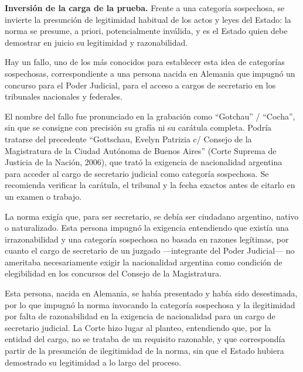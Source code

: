 \documentclass[12pt,oneside]{book}
\begin{document}
\begin{important}
\textbf{Inversión de la carga de la prueba.} Frente a una categoría sospechosa, se invierte la presunción de legitimidad habitual de los actos y leyes del Estado: la norma se presume, a priori, potencialmente inválida, y es el Estado quien debe demostrar en juicio su legitimidad y razonabilidad.
\end{important}

Hay un fallo, uno de los más conocidos para establecer esta idea de categorías sospechosas, correspondiente a una persona nacida en Alemania que impugnó un concurso para el Poder Judicial, para el acceso a cargos de secretario en los tribunales nacionales y federales.

\begin{important}
El nombre del fallo fue pronunciado en la grabación como ``Gotchau'' / ``Cocha'', sin que se consigne con precisión su grafía ni su carátula completa. Podría tratarse del precedente ``Gottschau, Evelyn Patrizia c/ Consejo de la Magistratura de la Ciudad Autónoma de Buenos Aires'' (Corte Suprema de Justicia de la Nación, 2006), que trató la exigencia de nacionalidad argentina para acceder al cargo de secretario judicial como categoría sospechosa. Se recomienda verificar la carátula, el tribunal y la fecha exactos antes de citarlo en un examen o trabajo.
\end{important}

La norma exigía que, para ser secretario, se debía ser ciudadano argentino, nativo o naturalizado. Esta persona impugnó la exigencia entendiendo que existía una irrazonabilidad y una categoría sospechosa no basada en razones legítimas, por cuanto el cargo de secretario de un juzgado —integrante del Poder Judicial— no ameritaba necesariamente exigir la nacionalidad argentina como condición de elegibilidad en los concursos del Consejo de la Magistratura.

Esta persona, nacida en Alemania, se había presentado y había sido desestimada, por lo que impugnó la norma invocando la categoría sospechosa y la ilegitimidad por falta de razonabilidad en la exigencia de nacionalidad para un cargo de secretario judicial. La Corte hizo lugar al planteo, entendiendo que, por la entidad del cargo, no se trataba de un requisito razonable, y que correspondía partir de la presunción de ilegitimidad de la norma, sin que el Estado hubiera demostrado su legitimidad a lo largo del proceso.
\end{document}

